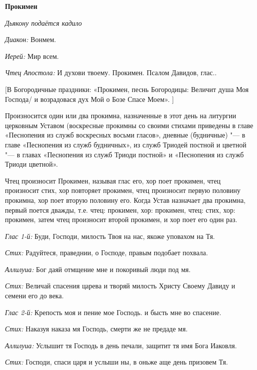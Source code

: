  

\medskip 

{\bfseries Прокимен }

 {\itshape Дьякону подаётся кадило}

 {\itshape Диакон:} Вонмем.

 {\itshape Иерей:} Мир всем.

 {\itshape Чтец Апостола:} И духови твоему. Прокимен. Псалом Давидов, глас..

 

[В Богородичные праздники: «Прокимен, песнь Богородицы: Величит душа Моя Господа/ и возрадовася дух Мой о Бозе Спасе Моем». ]

 Произносится один или два прокимна, назначенные в этот день на литургии церковным Уставом (воскресные прокимны со своими стихами приведены в главе «Песнопения из служб воскресных восьми гласов», дневные (будничные) "--- в главе «Песнопения из служб будничных», из служб Триодей постной и цветной "--- в главах «Песнопения из служб Триоди постной» и «Песнопения из служб Триоди цветной».

 Чтец произносит Прокимен, называя глас его, хор поет прокимен, чтец произносит стих, хор повторяет прокимен, чтец произносит первую половину прокимна, хор поет вторую половину его. Когда Устав назначает два прокимна, первый поется дважды, т.е. чтец: прокимен, хор: прокимен, чтец: стих, хор: прокимен, затем чтец произносит второй прокимен, и хор поет его один раз. 


 {\itshape Глас 1-й:} Буди, Господи, милость Твоя на нас, якоже уповахом на Тя.

 {\itshape Стих:} Радуйтеся, праведнии, о Господе, правым подобает похвала.

 {\itshape Аллилуиа:} Бог даяй отмщение мне и покоривый люди под мя.

 {\itshape Стих:} Величай спасения царева и творяй милость Христу Своему Давиду и семени его до века.

 {\itshape Глас 2-й:} Крепость моя и пение мое Господь. и бысть мне во спасение.

 {\itshape Стих:} Наказуя наказа мя Господь, смерти же не предаде мя.

 {\itshape Аллилуиа:} Услышит тя Господь в день печали, защитит тя имя Бога Иаковля.

 {\itshape Стих:} Господи, спаси царя и услыши ны, в оньже аще день призовем Тя.

